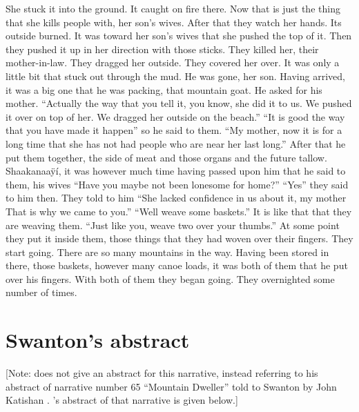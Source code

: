 \begin{pairs}
\begin{Rightside}
She stuck it into the ground.
It caught on fire there.
Now that is just the thing that she kills people with, her son’s wives.
After that they watch her hands.
Its outside burned.
It was toward her son’s wives that she pushed the top of it.
Then they pushed it up in her direction with those sticks.
They killed her, their mother-in-law.
They dragged her outside.
They covered her over.
It was only a little bit that stuck out through the mud.
\pend
\pstart
{}He was gone, her son.
Having arrived, it was a big one that he was packing, that mountain goat.
He asked for his mother.
\qqk{}“Actually the way that you tell it, you know, she did it to us.
We pushed it over on top of her.
We dragged her outside on the beach.”
\qqk{}“It is good the way that you have made it happen”
so he said to them.
\qqk{}“My mother, now it is for a long time that she has not had people who are near her last long.”
After that he put them together, the side of meat and those organs and the future tallow.
\pend
\pstart
{}Shaakanaaÿí, it was however much time having passed upon him that he said to them, his wives
\qqk{}“Have you maybe not been lonesome for home?”
\qqk{}“Yes” they said to him then.
They told to him
\qqk{}“She lacked confidence in us about it, my mother
That is why we came to you.”
\qqk{}“Well weave some baskets.”
It is like that that they are weaving them.
\qqk{}“Just like you, weave two over your thumbs.”
At some point they put it inside them, those things that they had woven over their fingers.
They start going.
There are so many mountains in the way.
Having been stored in there, those baskets, however many canoe loads,
it was both of them that he put over his fingers.
With both of them they began going.
They overnighted some number of times.
\pend
\endnumbering
\end{Rightside}
\end{pairs}
\Columns


\section{Swanton’s abstract}\label{sec:92-swanton-abstract}

{}[Note: \citeauthor{swanton:1909} does not give an abstract for this narrative, instead referring to his abstract of narrative number 65 “Mountain Dweller” told to Swanton by  John Katishan \parencite[222–224]{swanton:1909}.
\citeauthor{swanton:1909}’s abstract of that narrative \parencite[441]{swanton:1909} is given below.]

